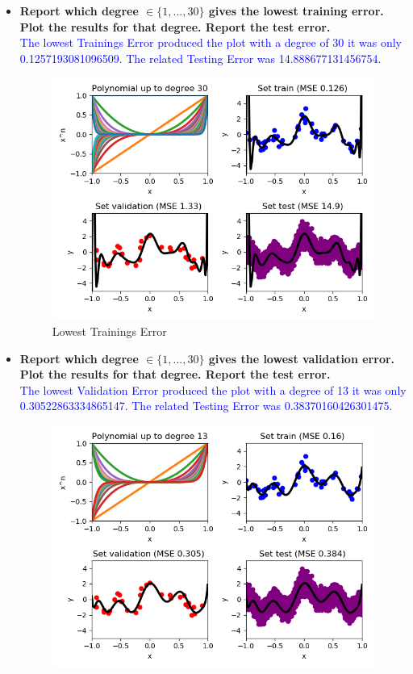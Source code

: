 \documentclass[a4paper]{article}
\begin{document}
\begin{itemize}
\newpage

\item \textbf{Report which degree $\in  \{1, . . . , 30\}$ gives the lowest training error. Plot the results for that degree. Report the test error.} \\
\textcolor{blue}{ The lowest Trainings Error produced the plot with a degree of 30 it was only 0.1257193081096509. The related Testing Error was 14.888677131456754.}
\begin{figure}[ht]
    \centering
  \includegraphics[scale=0.50]{plots/plot_poly_degree30.png}
 \captionsetup{justification=centering}
  \caption{Lowest Trainings Error}
    \label{plot_poly_degree30_lowest_trainings_error}
  \end{figure}
\item \textbf{Report which degree $\in  \{1, . . . , 30\}$ gives the lowest validation error. Plot the results for that degree. Report the test error.} \\
\textcolor{blue}{ The lowest Validation Error produced the plot with a degree of 13 it was only 0.30522863334865147. The related Testing Error was 0.38370160426301475.}
\begin{figure}[ht]
    \centering
  \includegraphics[scale=0.50]{plots/plot_poly_degree13.png}

\end{figure}
\end{itemize}
\end{document}
